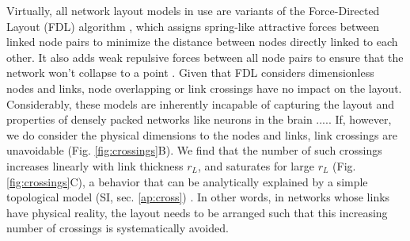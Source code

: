 \documentclass[nofootinbib,preprint,floatfix,titlepage,endfloats]{revtex4} %
\begin{document}
Virtually, all network layout models in use are variants of the Force-Directed Layout (FDL) algorithm \cite{kamada1989algorithm,davidson1996drawing,fruchterman1991graph,barnes1986hierarchical}, which assigns spring-like attractive forces between linked node pairs to minimize the distance between nodes directly linked to each other. It also adds weak repulsive forces between all node pairs to ensure that the network won't collapse to a point  
 \cite{kabourov2015spring}.
Given that FDL considers dimensionless nodes and links, node overlapping or link crossings have no impact on the layout. Considerably, these models are inherently incapable of capturing the layout and properties of densely packed networks like neurons in the brain .....
If, however, we do consider the physical dimensions to the nodes and links, link crossings are unavoidable (Fig. \ref{fig:crossings}B). 
We find that the number of such crossings increases linearly with link thickness $r_L$, and saturates for large $r_L$ (Fig. \ref{fig:crossings}C), a behavior that can be analytically explained by a simple topological model (SI, sec. \ref{ap:cross}) . In other words, in networks whose links have physical reality, the layout needs to be  arranged such that this increasing number of crossings is systematically avoided.
\end{document}

